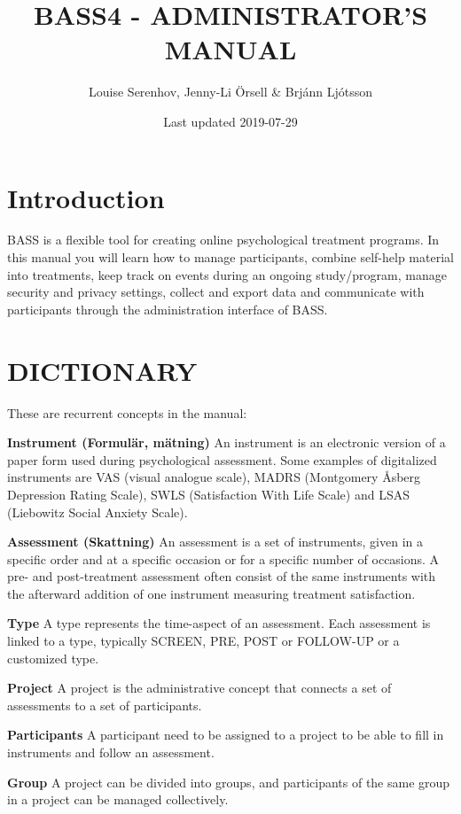 \documentclass[]{book}
\title{BASS4 - ADMINISTRATOR'S MANUAL}
\author{Louise Serenhov, Jenny-Li Örsell \& Brjánn Ljótsson}
\date{Last updated 2019-07-29}
\begin{document}
\maketitle

{
\setcounter{tocdepth}{1}
\tableofcontents
}
\hypertarget{introduction}{%
\chapter{Introduction}\label{introduction}}

BASS is a flexible tool for creating online psychological treatment programs.
In this manual you will learn how to manage participants, combine self-help material into treatments, keep track on events during an ongoing study/program, manage security and privacy settings, collect and export data and communicate with participants through the administration interface of BASS.

\hypertarget{dictionary}{%
\chapter{DICTIONARY}\label{dictionary}}

These are recurrent concepts in the manual:

\textbf{Instrument (Formulär, mätning)}
An instrument is an electronic version of a paper form used during psychological assessment. Some examples of digitalized instruments are VAS (visual analogue scale), MADRS (Montgomery Åsberg Depression Rating Scale), SWLS (Satisfaction With Life Scale) and LSAS (Liebowitz Social Anxiety Scale).

\textbf{Assessment (Skattning)}
An assessment is a set of instruments, given in a specific order and at a specific occasion or for a specific number of occasions. A pre- and post-treatment assessment often consist of the same instruments with the afterward addition of one instrument measuring treatment satisfaction.

\textbf{Type}
A type represents the time-aspect of an assessment. Each assessment is linked to a type, typically SCREEN, PRE, POST or FOLLOW-UP or a customized type.

\textbf{Project}
A project is the administrative concept that connects a set of assessments to a set of participants.

\textbf{Participants}
A participant need to be assigned to a project to be able to fill in instruments and follow an assessment.

\textbf{Group}
A project can be divided into groups, and participants of the same group in a project can be managed collectively.
\end{document}

